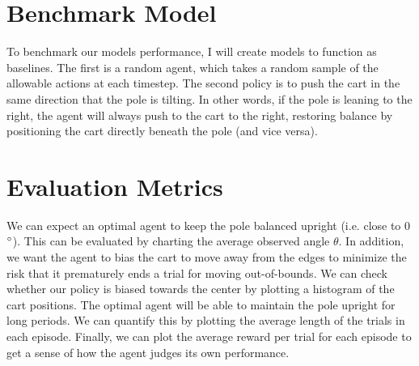\documentclass[12pt,a4paper]{article}
\begin{document}
\section*{Benchmark Model}
%
%
To benchmark our models performance, I will create models to function as baselines. The first is a random agent, which takes a random sample of the allowable actions at each timestep. The second policy is to push the cart in the same direction that the pole is tilting. In other words, if the pole is leaning to the right, the agent will always push to the cart to the right, restoring balance by positioning the cart directly beneath the pole (and vice versa).
%
\section*{Evaluation Metrics}
%

We can expect an optimal agent to keep the pole balanced upright (i.e. close to 0$\degree$). This can be evaluated by charting the average observed angle $\theta$. In addition, we want the agent to bias the cart to move away from the edges to minimize the risk that it prematurely ends a trial for moving out-of-bounds. We can check whether our policy is biased towards the center by plotting a histogram of the cart positions. The optimal agent will be able to maintain the pole upright for long periods. We can quantify this by plotting the average length of the trials in each episode. Finally, we can plot the average reward per trial for each episode to get a sense of how the agent judges its own performance.
\end{document}
